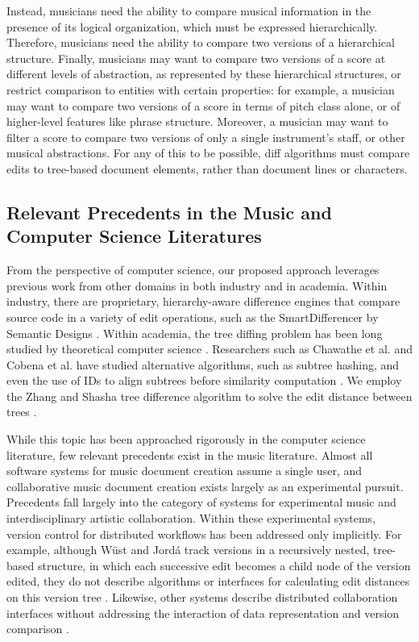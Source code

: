 \documentclass{article}
\begin{document}
Instead, musicians need the ability to compare musical information in
the presence of its logical organization, which must be expressed
hierarchically.  Therefore, musicians need the ability to compare two
versions of a hierarchical structure.  Finally, musicians may want to
compare two versions of a score at different levels of abstraction, as
represented by these hierarchical structures, or restrict comparison
to entities with certain properties: for example, a musician may want
to compare two versions of a score in terms of pitch class alone, or
of higher-level features like phrase structure. Moreover, a musician
may want to filter a score to compare two versions of only a single
instrument's staff, or other musical abstractions. For any of this to be possible, diff algorithms must compare edits to tree-based document elements, rather than document lines or characters.

\subsection{Relevant Precedents in the Music and Computer Science Literatures}
From the perspective of computer science, our proposed approach leverages previous work from other domains in both
industry and in academia.  Within industry, there are proprietary,
hierarchy-aware difference engines that compare source code in a variety of 
edit operations, such as the SmartDifferencer by Semantic Designs
\cite{Designs:qm}.  Within academia, the tree diffing problem has been
long studied by theoretical computer science \cite{Bille:2005ec}.
Researchers such as Chawathe et al. and Cobena et
al. have studied alternative algorithms, such as subtree hashing, 
and even the use of IDs to align subtrees before similarity 
computation \cite{Chawathe:1996jb,Cobena:2002gd}.  We employ the Zhang 
and Shasha tree difference algorithm to solve the edit distance between
trees \cite{Zhang:1989ec,Zhang:1989il}.

While this topic has been approached rigorously in the computer science literature, few relevant precedents exist in the music literature. Almost all software systems for music document creation assume a single user, and collaborative music document creation exists largely as an experimental pursuit. Precedents fall largely into the category of systems for experimental music and interdisciplinary artistic collaboration. Within these experimental systems, version control for distributed workflows has been addressed only implicitly. For example, although W\"{u}st and Jord\'{a} track versions in a recursively nested, tree-based structure, in which each successive edit becomes a child node of the version edited, they do not describe algorithms or interfaces for calculating edit distances on this version tree \cite{wust2001architectural}. Likewise, other systems describe distributed collaboration interfaces without addressing the interaction of data representation and version comparison \cite{Balachandran:2012cr,Hepting2005}.
\end{document}
